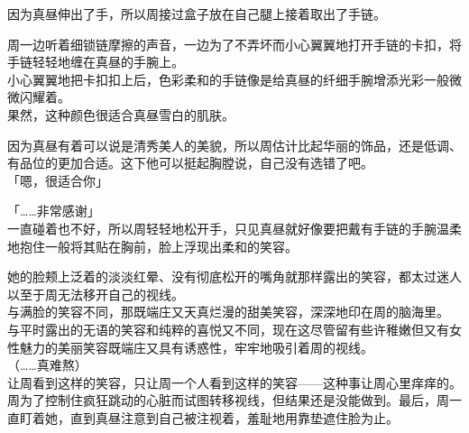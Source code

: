 因为真昼伸出了手，所以周接过盒子放在自己腿上接着取出了手链。

周一边听着细锁链摩擦的声音，一边为了不弄坏而小心翼翼地打开手链的卡扣，将手链轻轻地缠在真昼的手腕上。\\

小心翼翼地把卡扣扣上后，色彩柔和的手链像是给真昼的纤细手腕增添光彩一般微微闪耀着。\\

果然，这种颜色很适合真昼雪白的肌肤。

因为真昼有着可以说是清秀美人的美貌，所以周估计比起华丽的饰品，还是低调、有品位的更加合适。这下他可以挺起胸膛说，自己没有选错了吧。\\

「嗯，很适合你」

「……非常感谢」\\

一直碰着也不好，所以周轻轻地松开手，只见真昼就好像要把戴有手链的手腕温柔地抱住一般将其贴在胸前，脸上浮现出柔和的笑容。

她的脸颊上泛着的淡淡红晕、没有彻底松开的嘴角就那样露出的笑容，都太过迷人以至于周无法移开自己的视线。\\

与满脸的笑容不同，那既端庄又天真烂漫的甜美笑容，深深地印在周的脑海里。\\

与平时露出的无语的笑容和纯粹的喜悦又不同，现在这尽管留有些许稚嫩但又有女性魅力的美丽笑容既端庄又具有诱惑性，牢牢地吸引着周的视线。\\

（……真难熬）\\

让周看到这样的笑容，只让周一个人看到这样的笑容——这种事让周心里痒痒的。\\

周为了控制住疯狂跳动的心脏而试图转移视线，但结果还是没能做到。最后，周一直盯着她，直到真昼注意到自己被注视着，羞耻地用靠垫遮住脸为止。
